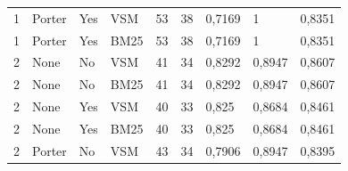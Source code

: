 \begin{table}[h]
{\begin{tabular}{lllllllll}
\rowcolor[HTML]{EFEFEF} 
1                                   & Porter                         & Yes                              & VSM                             & 53                               & 38                              & 0,7169                           & 1                             & 0,8351                         \\
\rowcolor[HTML]{EFEFEF} 
1                                   & Porter                         & Yes                              & BM25                            & 53                               & 38                              & 0,7169                           & 1                             & 0,8351                         \\
\rowcolor[HTML]{C0C0C0} 
2                                   & None                           & No                               & VSM                             & 41                               & 34                              & 0,8292                           & 0,8947                        & 0,8607                         \\
\rowcolor[HTML]{C0C0C0} 
2                                   & None                           & No                               & BM25                            & 41                               & 34                              & 0,8292                           & 0,8947                        & 0,8607                         \\
\rowcolor[HTML]{C0C0C0} 
2                                   & None                           & Yes                              & VSM                             & 40                               & 33                              & 0,825                            & 0,8684                        & 0,8461                         \\
\rowcolor[HTML]{C0C0C0} 
2                                   & None                           & Yes                              & BM25                            & 40                               & 33                              & 0,825                            & 0,8684                        & 0,8461                         \\
\rowcolor[HTML]{C0C0C0} 
2                                   & Porter                         & No                               & VSM                             & 43                               & 34                              & 0,7906                           & 0,8947                        & 0,8395                         \\

\end{tabular}}
\end{table}
